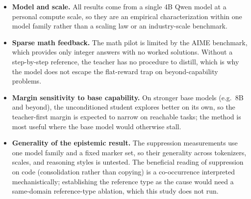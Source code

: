 \begin{itemize}
\tightlist
\item
  \textbf{Model and scale.} All results come from a single 4B Qwen model at a personal compute scale, so they are an empirical characterization within one model family rather than a scaling law or an industry-scale benchmark.
\item
  \textbf{Sparse math feedback.} The math pilot is limited by the AIME benchmark, which provides only integer answers with no worked solutions. Without a step-by-step reference, the teacher has no procedure to distill, which is why the model does not escape the flat-reward trap on beyond-capability problems.
\item
  \textbf{Margin sensitivity to base capability.} On stronger base models (e.g.\ 8B and beyond), the unconditioned student explores better on its own, so the teacher-first margin is expected to narrow on reachable tasks; the method is most useful where the base model would otherwise stall.
\item
  \textbf{Generality of the epistemic result.} The suppression measurements use one model family and a fixed marker set, so their generality across tokenizers, scales, and reasoning styles is untested. The beneficial reading of suppression on code (consolidation rather than copying) is a co-occurrence interpreted mechanistically; establishing the reference type as the cause would need a same-domain reference-type ablation, which this study does not run.
\end{itemize}
